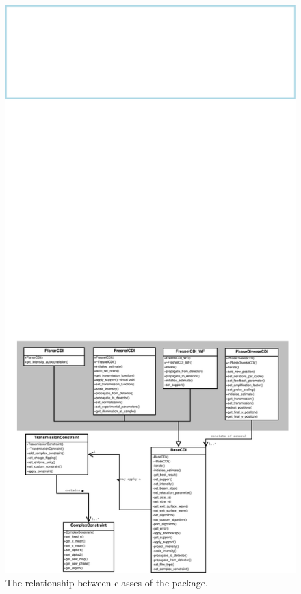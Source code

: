 \documentclass[]{cxs-software}
\begin{document}
\begin{figure}[htbp]
\centering \includegraphics*[scale=0.32,viewport = 0 0 1500
  1200]{cxs_class_diagram.eps}
\caption[]{The relationship between classes of the \name package.
\label{fig:class_diagram}}
\end{figure}
\end{document}
